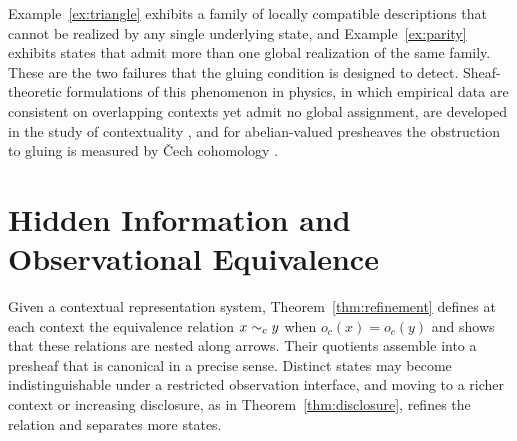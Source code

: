 Example~\ref{ex:triangle} exhibits a family of locally compatible descriptions that cannot be realized by any single underlying state, and Example~\ref{ex:parity} exhibits states that admit more than one global realization of the same family. These are the two failures that the gluing condition is designed to detect. Sheaf-theoretic formulations of this phenomenon in physics, in which empirical data are consistent on overlapping contexts yet admit no global assignment, are developed in the study of contextuality \cite{abramsky}, and for abelian-valued presheaves the obstruction to gluing is measured by \v{C}ech cohomology \cite{maclanemoerdijk}.

\section{Hidden Information and Observational Equivalence}

Given a contextual representation system, Theorem~\ref{thm:refinement} defines at each context the equivalence relation $x\sim_c y$ when $o_c(x)=o_c(y)$ and shows that these relations are nested along arrows. Their quotients assemble into a presheaf that is canonical in a precise sense. Distinct states may become indistinguishable under a restricted observation interface, and moving to a richer context or increasing disclosure, as in Theorem~\ref{thm:disclosure}, refines the relation and separates more states.

